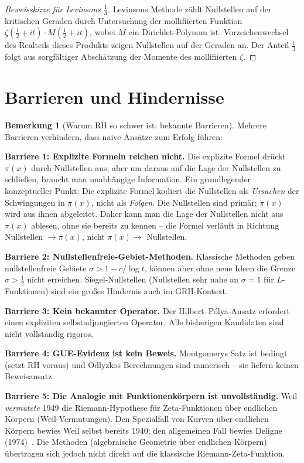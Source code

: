 \documentclass[12pt,a4paper]{amsart}
\theoremstyle{definition}
\newtheorem{remark}[theorem]{Bemerkung}
\begin{document}
\begin{proof}[Beweisskizze f\"ur Levinsons $\tfrac{1}{3}$]
Levinsons Methode z\"ahlt Nullstellen auf der kritischen Geraden
durch Untersuchung der \glqq mollifiierten\grqq{} Funktion
$\zeta(\tfrac{1}{2}+it) \cdot M(\tfrac{1}{2}+it)$,
wobei $M$ ein Dirichlet-Polynom ist.
Vorzeichenwechsel des Realteils dieses Produkts zeigen Nullstellen auf
der Geraden an.
Der Anteil $\tfrac{1}{3}$ folgt aus sorgf\"altiger Absch\"atzung der
Momente des mollifiierten $\zeta$.
\end{proof}

\section{Barrieren und Hindernisse}

\begin{remark}[Warum RH so schwer ist: bekannte Barrieren]
Mehrere Barrieren verhindern, dass naive Ans\"atze zum Erfolg f\"uhren:

\textbf{Barriere 1: Explizite Formeln reichen nicht.}
Die explizite Formel dr\"uckt $\pi(x)$ durch Nullstellen aus, aber um
daraus auf die Lage der Nullstellen zu schlie\ss en, braucht man
unabh\"angige Information.
Ein grundlegender konzeptueller Punkt: Die explizite Formel kodiert die Nullstellen
als \emph{Ursachen} der Schwingungen in $\pi(x)$, nicht als \emph{Folgen}.
Die Nullstellen sind prim\"ar; $\pi(x)$ wird aus ihnen abgeleitet.
Daher kann man die Lage der Nullstellen nicht aus $\pi(x)$ ablesen, ohne sie
bereits zu kennen -- die Formel verl\"auft in Richtung Nullstellen $\to \pi(x)$,
nicht $\pi(x) \to$ Nullstellen.

\textbf{Barriere 2: Nullstellenfreie-Gebiet-Methoden.}
Klassische Methoden geben nullstellenfreie Gebiete $\sigma > 1 - c/\log t$,
k\"onnen aber ohne neue Ideen die Grenze $\sigma > \tfrac{1}{2}$ nicht
erreichen.
Siegel-Nullstellen (Nullstellen sehr nahe an $\sigma = 1$ f\"ur
$L$-Funktionen) sind ein gro\ss es Hindernis auch im GRH-Kontext.

\textbf{Barriere 3: Kein bekannter Operator.}
Der Hilbert--P\'olya-Ansatz erfordert einen expliziten selbstadjungierten
Operator. Alle bisherigen Kandidaten sind nicht vollst\"andig rigoros.

\textbf{Barriere 4: GUE-Evidenz ist kein Beweis.}
Montgomerys Satz ist bedingt (setzt RH voraus) und Odlyzkos Berechnungen
sind numerisch -- sie liefern keinen Beweisansatz.

\textbf{Barriere 5: Die Analogie mit Funktionenk\"orpern ist unvollst\"andig.}
Weil \emph{vermutete} 1949 die Riemann-Hypothese f\"ur Zeta-Funktionen
\"uber endlichen K\"orpern (Weil-Vermutungen). Den Spezialfall von Kurven
\"uber endlichen K\"orpern bewies Weil selbst bereits 1940; den allgemeinen
Fall bewies Deligne (1974)~\cite{Deligne1974}.
Die Methoden (algebraische Geometrie \"uber endlichen K\"orpern)
\"ubertragen sich jedoch nicht direkt auf die klassische Riemann-Zeta-Funktion.
\end{remark}
\end{document}
